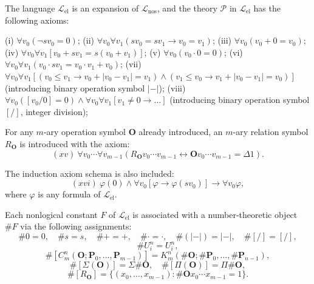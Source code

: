 The language $\mathcal{L}_{\text{el}}$ is an expansion of $\mathcal{L}_{\text{nos}}$, and the theory $\mathcal{P}$ in $\mathcal{L}_{\text{el}}$ has the following axioms:

(i) $\forall v_0(\neg s v_0 = 0)$;
(ii) $\forall v_0 \forall v_1(s v_0 = s v_1 \rightarrow v_0 = v_1)$;
(iii) $\forall v_0(v_0 + 0 = v_0)$;
(iv) $\forall v_0 \forall v_1[v_0 + s v_1 = s(v_0 + v_1)]$;
(v) $\forall v_0(v_0 \cdot 0 = 0)$;
(vi) $\forall v_0 \forall v_1(v_0 \cdot s v_1 = v_0 \cdot v_1 + v_0)$;
(vii) $\forall v_0 \forall v_1[(v_0 \leq v_1 \rightarrow v_0 + |v_0 - v_1| = v_1) \wedge (v_1 \leq v_0 \rightarrow v_1 + |v_0 - v_1| = v_0)]$ (introducing binary operation symbol $|-|$);
(viii) $\forall v_0([v_0/0] = 0) \wedge \forall v_0 \forall v_1[v_1 \neq 0 \rightarrow \dots]$ (introducing binary operation symbol $[/]$, integer division);

For any $m$-ary operation symbol $\mathbf{O}$ already introduced, an $m$-ary relation symbol $R_{\mathbf{O}}$ is introduced with the axiom:
$$(xv) \ \forall v_0 \cdots \forall v_{m-1}(R_{\mathbf{O}} v_0 \cdots v_{m-1} \leftrightarrow \mathbf{O} v_0 \cdots v_{m-1} = \Delta 1).$$

The induction axiom schema is also included:
$$(xvi) \ \varphi(0) \land \forall v_0 [\varphi \rightarrow \varphi(s v_0)] \rightarrow \forall v_0 \varphi,$$
where $\varphi$ is any formula of $\mathcal{L}_{\text{el}}$.

Each nonlogical constant $F$ of $\mathcal{L}_{\text{el}}$ is associated with a number-theoretic object $\#F$ via the following assignments:
$$\#0 = 0, \quad \#s = s, \quad \#+ = +, \quad \#\cdot = \cdot, \quad \#(|-|) = |-|, \quad \#[/] = [/],$$
$$\#U_i^n = U_i^n,$$
$$\#[C_m^n(\mathbf{O}; \mathbf{P}_0, \ldots, \mathbf{P}_{m-1})] = K_m^n(\#\mathbf{O}; \#\mathbf{P}_0, \ldots, \#\mathbf{P}_{n-1}),$$
$$\#[\Sigma(\mathbf{O})] = \Sigma\#\mathbf{O}, \quad \#[\Pi(\mathbf{O})] = \Pi\#\mathbf{O},$$
$$\#[R_{\mathbf{O}}] = \{(x_0, \ldots, x_{m-1}): \#\mathbf{O} x_0 \cdots x_{m-1} = 1\}.$$
